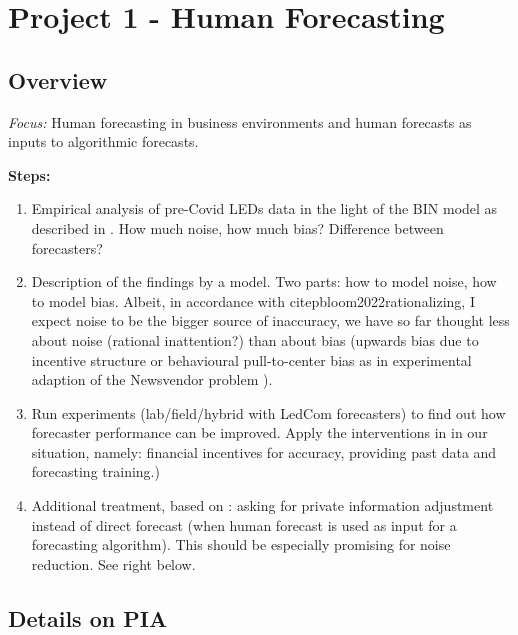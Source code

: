 \documentclass[12pt,a4paper]{article}
\begin{document}
\section{Project 1 - Human Forecasting}
\label{sec:1}

\subsection{Overview}

\emph{Focus:} Human forecasting in business environments and human forecasts as inputs to algorithmic forecasts.     
      
\textbf{Steps:}    
\begin{enumerate}
	
	\item Empirical analysis of pre-Covid LEDs data in the light of the BIN model as described in \cite{satopaa2021bias}. How much noise, how much bias? Difference between forecasters?
				
	\item Description of the findings by a model. Two parts: how to model noise, how to model bias.     
		Albeit, in accordance with citep{bloom2022rationalizing}, I expect noise to be the bigger source of inaccuracy, we have so far thought less about noise (rational inattention?) than about bias (upwards bias due to incentive structure or behavioural pull-to-center bias as in experimental adaption of the Newsvendor problem \citep{ockenfels2014impulse}).

	\item Run experiments (lab/field/hybrid with LedCom forecasters) to find out how forecaster performance can be improved. Apply the interventions in \cite{bloom2022rationalizing} in our situation, namely: financial incentives for accuracy, providing past data and forecasting training.)
		
	\item Additional treatment, based on \cite{ibrahim2021eliciting}: asking for private information adjustment instead of direct forecast (when human forecast is used as input for a forecasting algorithm). This should be especially promising for noise reduction. See right below.
		
\end{enumerate}

\subsection{Details on PIA}
\end{document}
